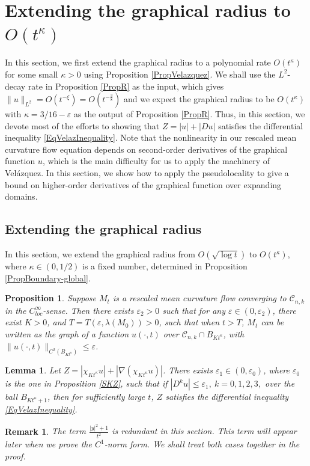 \documentclass[11pt]{amsart}
\numberwithin{equation}{section}
\newtheorem{proposition}[theorem]{Proposition}
\newtheorem{lemma}[theorem]{Lemma}
\newtheorem{remark}[theorem]{Remark}
\numberwithin{equation}{section}
\newcommand{\eps}{\varepsilon}
\newcommand{\cC}{\mathcal{C}}
\begin{document}
	
	
	\section{Extending the graphical radius to $O(t^{\kappa})$}\label{S:Extending_t_kappa}
	In this section, we first extend the graphical radius to a polynomial rate $O(t^{\kappa})$ for some small $\kappa>0$ using Proposition \ref{PropVelazquez}. We shall use the $L^2$-decay rate in Proposition \ref{PropR} as the input, which gives $\|u\|_{L^2}=O(t^{-\xi})=O(t^{-\frac{3}{8}})$ and we expect the graphical radius to be $O(t^{\kappa})$ with $\kappa=3/16-\eps$ as the output of Proposition \ref{PropR}. Thus, in this section, we devote most of the efforts to showing that $Z=|u|+|Du|$ satisfies the differential inequality \eqref{EqVelazInequality}. Note that the nonlinearity in our rescaled mean curvature flow equation depends on second-order derivatives of the graphical function $u$, which is the main difficulty for us to apply the machinery of Vel\'azquez. In this section, we show how to apply the pseudolocality to give a bound on higher-order derivatives of the graphical function over expanding domains.  
	
	\subsection{Extending the graphical radius}
	In this section, we extend the graphical radius from $O(\sqrt{\log t})$ to $O(t^\kappa)$, where $\kappa\in(0,1/2)$ is a fixed number, determined in Proposition \ref{PropBoundary-global}. 
	
	\begin{proposition}\label{thm:mainthmfor sqrtt}
		Suppose $M_t$ is a rescaled mean curvature flow converging to $\cC_{n,k}$ in the $C^\infty_{loc}$-sense. Then there exists $\eps_2>0$ such that for any $\eps\in(0,\eps_2)$, there exist $K>0$, and $T=T(\eps,\lambda(M_0))>0$, such that when $t>T$, $M_t$ can be written as the graph of a function $u(\cdot,t)$ over $\cC_{n,k}\cap B_{K t^\kappa}$, with $\|u(\cdot,t)\|_{C^2(B_{ K t^\kappa})}\leq \eps$.
	\end{proposition}
	\begin{lemma}\label{LmVelaz}
		Let $Z=|\chi_{Kt^\kappa}u|+|\nabla (\chi_{Kt^\kappa}u)|$. There exists $\eps_1\in(0,\eps_0)$, where $\eps_0$ is the one in Proposition \ref{SKZ}, such that if $|D^ku|\leq \eps_1,\ k=0, 1,2,3,$ over the ball $B_{Kt^\kappa+1}$, then for sufficiently large $t$, $Z$ satisfies the differential inequality \eqref{EqVelazInequality}.
	\end{lemma}   
	\begin{remark}
		The term $\frac{|y|^2+1}{t^2}$ is redundant in this section. This term will appear later when we prove the $C^1$-norm form. We shall treat both cases together in the proof. 
	\end{remark}
	
\end{document}
